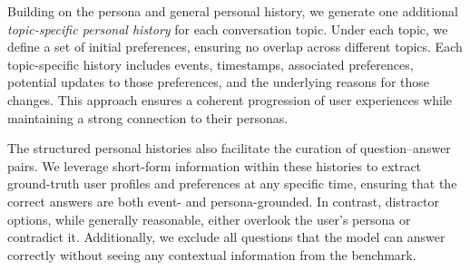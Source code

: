 Building on the persona and general personal history, we generate one additional \textit{topic-specific personal history} for each conversation topic. Under each topic, we define a set of initial preferences, ensuring no overlap across different topics. Each topic-specific history includes events, timestamps, associated preferences, potential updates to those preferences, and the underlying reasons for those changes. This approach ensures a coherent progression of user experiences while maintaining a strong connection to their personas.


The structured personal histories also facilitate the curation of question–answer pairs. We leverage short-form information within these histories to extract ground-truth user profiles and preferences at any specific time, ensuring that the correct answers are both event- and persona-grounded. In contrast, distractor options, while generally reasonable, either overlook the user’s persona or contradict it. Additionally, we exclude all questions that the model can answer correctly without seeing any contextual information from the benchmark.





